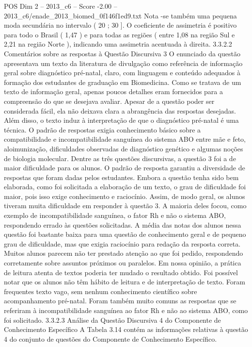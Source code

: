 \begin{textsample}{POS Dim 2 – 2013\_c6 – Score -2.00 – 2013\_c6/enade\_2013\_biomed\_0f146f1ed9.txt}
Nota -se também uma pequena moda secundária no intervalo ( 20 ; 30 ].
O coeficiente de assimetria é positivo para todo o Brasil ( 1,47 ) e para todas as regiões ( entre 1,08 na região Sul e 2,21 na região Norte ), indicando uma assimetria acentuada à direita. 3.3.2.2 Comentários sobre as respostas à Questão Discursiva 3 O enunciado da questão apresentava um texto da literatura de divulgação como referência de informação geral sobre diagnóstico pré-natal, claro, com linguagem e conteúdo adequados à formação dos estudantes de graduação em Biomedicina.
Como se tratava de um texto de informação geral, apenas poucos detalhes eram fornecidos para a compreensão do que se desejava avaliar.
Apesar de a questão poder ser considerada fácil, ela não deixava clara a abrangência das respostas desejadas.
Além disso, o texto induz à interpretação de que o diagnóstico pré-natal é uma técnica.
O padrão de respostas exigia conhecimento básico sobre a compatibilidade e incompatibilidade sanguínea do sistema ABO entre mãe e feto, aloimunização, dificuldades observadas de diagnóstico genético e algumas noções de biologia molecular.
Dentre as três questões discursivas, a questão 3 foi a de maior dificuldade para os alunos.
O padrão de resposta garantiu a diversidade de respostas que foram dadas pelos estudantes.
Embora a questão tenha sido bem elaborada, como foi solicitada a elaboração de um texto, o grau de dificuldade foi maior, pois isso exige conhecimento e raciocínio.
Assim, de modo geral, os alunos tiveram muita dificuldade em responder à questão 3.
A maioria deles focou, como exemplo de incompatibilidade sanguínea, o fator Rh e não o sistema ABO, respondendo errado às questões solicitadas.
A média das notas dos alunos nessa questão foi bastante baixa para uma questão de conhecimento geral e de pequeno grau de dificuldade, mas que exigia raciocínio para redação da resposta correta.
Muitos alunos parecem não ter prestado atenção ao que foi pedido, respondendo corretamente sobre assuntos próximos ou paralelos.
Em nossa opinião, a prática de leitura atenta de textos poderia ter mudado o resultado obtido.
Foi possível notar que os alunos não têm hábito de leitura e de interpretação de texto.
Foram frequentes texto vago, sem nenhum conhecimento científico sobre acompanhamento pré-natal.
Foram também muito comuns as respostas que se referiram à incompatibilidade sanguínea ao fator Rh e não ao sistema ABO, como foi solicitado. 3.3.2.3 Análise da Questão Discursiva 4 do Componente de Conhecimento Específico A Tabela 3.14 contém as informações relativas à questão 4 do conjunto de questões do Componente de Conhecimento Específico.

\end{textsample}
